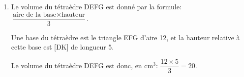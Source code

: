 \begin{enumerate}
\begin{enumerate}
Donc la distance DK est égale à 5~cm.
		
		\item Le volume du tétraèdre DEFG est donné par la formule:
$ \dfrac{\text{aire de la base}\times\text{hauteur}}{3}$.

Une base du tétraèdre est le triangle EFG d'aire 12,
et la hauteur relative à cette base est [DK] de longueur 5.				

Le volume du tétraèdre DEFG est donc, en cm$^3$:
$\dfrac{12\times 5}{3}=20$.
	\end{enumerate}
\end{enumerate}

\bigskip
